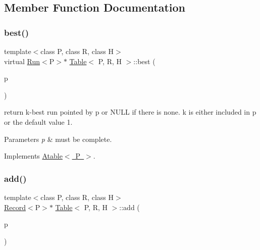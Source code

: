\subsection{Member Function Documentation}
\mbox{\label{classTable_a2e8c9b5856741684b1ec7d8fc640cc81}} 
\subsubsection{\texorpdfstring{best()}{best()}}
{\footnotesize\ttfamily template$<$class P, class R, class H$>$ \\
virtual \mbox{\hyperlink{classRun}{Run}}$<$P$>$$\ast$ \mbox{\hyperlink{classTable}{Table}}$<$ P, R, H $>$\+::best (\begin{DoxyParamCaption}\item[{const P \&}]{p }\end{DoxyParamCaption})\hspace{0.3cm}{\ttfamily [virtual]}}



return k-\/best run pointed by p or N\+U\+LL if there is none. k is either included in p or the default value 1. 


\begin{DoxyParams}{Parameters}
{\em p} & must be complete. \\
\hline
\end{DoxyParams}


Implements \mbox{\hyperlink{classAtable_a60515b93afede66f01a0e89edb563800}{Atable$<$ P $>$}}.

\mbox{\label{classTable_a69ccf554edee39f61692c26a3b4667e1}} 
\subsubsection{\texorpdfstring{add()}{add()}\hspace{0.1cm}{\footnotesize\ttfamily [1/2]}}
{\footnotesize\ttfamily template$<$class P, class R, class H$>$ \\
\mbox{\hyperlink{classRecord}{Record}}$<$P$>$$\ast$ \mbox{\hyperlink{classTable}{Table}}$<$ P, R, H $>$\+::add (\begin{DoxyParamCaption}\item[{const P \&}]{p }\end{DoxyParamCaption})}



